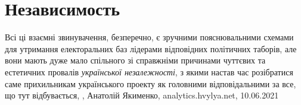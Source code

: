  
 
 
 
 
\chapter{Независимость}

Всі ці взаємні звинувачення, безперечно, є зручними пояснювальними схемами для
утримання електоральних баз лідерами відповідних політичних таборів, але вони
мають дуже мало спільного зі справжніми причинами чуттєвих та естетичних
провалів \emph{української незалежності}, з якими настав час розібратися саме
прихильникам українського проекту як головними відповідальними за все, що тут
відбувається,
, Анатолій Якименко, analytics.hvylya.net, 10.06.2021

